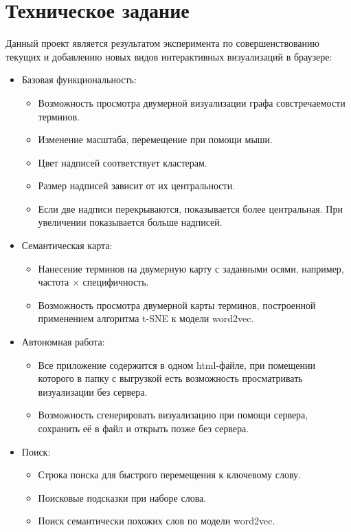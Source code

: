 \section{Техническое задание}

Данный проект является результатом эксперимента по совершенствованию текущих и добавлению новых видов интерактивных визуализаций в браузере:
\begin{itemize}
\item Базовая функциональность:
  \begin{itemize}
  \item Возможность просмотра двумерной визуализации графа совстречаемости терминов.
  \item Изменение масштаба, перемещение при помощи мыши.
  \item Цвет надписей соответствует кластерам.
  \item Размер надписей зависит от их центральности.
  \item Если две надписи перекрываются, показывается более центральная. При увеличении показывается больше надписей.
  \end{itemize}

\item Семантическая карта:
  \begin{itemize}
  \item Нанесение терминов на двумерную карту с заданными осями, например, частота $\times$ специфичность.
  \item Возможность просмотра двумерной карты терминов, построенной применением алгоритма t-SNE к модели word2vec.
  \end{itemize}

\item Автономная работа:
  \begin{itemize}
  \item Все приложение содержится в одном html-файле, при помещении которого в папку с выгрузкой есть возможность просматривать визуализации без сервера.
  \item Возможность сгенерировать визуализацию при помощи сервера, сохранить её в файл и открыть позже без сервера.
  \end{itemize}

\item Поиск:
  \begin{itemize}
  \item Строка поиска для быстрого перемещения к ключевому слову.
  \item Поисковые подсказки при наборе слова.
  \item Поиск семантически похожих слов по модели word2vec.
  \end{itemize}


\end{itemize}
